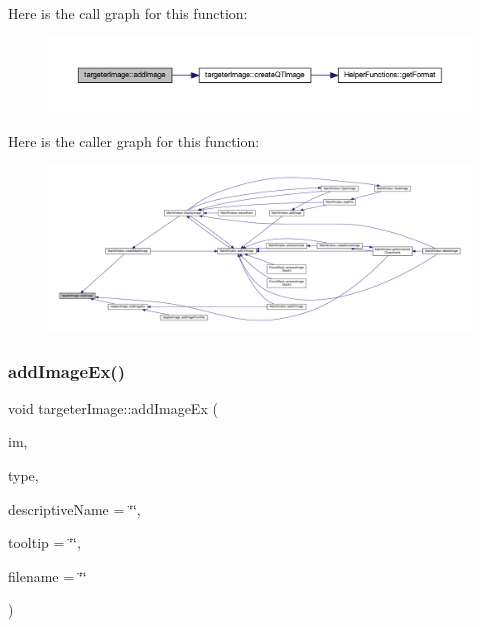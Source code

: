 Here is the call graph for this function\+:
\nopagebreak
\begin{figure}[H]
\begin{center}
\leavevmode
\includegraphics[width=350pt]{classtargeter_image_a20a228c177141e4f0ca2a7776c7f242d_cgraph}
\end{center}
\end{figure}
Here is the caller graph for this function\+:
\nopagebreak
\begin{figure}[H]
\begin{center}
\leavevmode
\includegraphics[width=350pt]{classtargeter_image_a20a228c177141e4f0ca2a7776c7f242d_icgraph}
\end{center}
\end{figure}
\mbox{\label{classtargeter_image_a71d81d6bc145df61da64989c14444d76}} 
\subsubsection{\texorpdfstring{add\+Image\+Ex()}{addImageEx()}}
{\footnotesize\ttfamily void targeter\+Image\+::add\+Image\+Ex (\begin{DoxyParamCaption}\item[{cv\+::\+Mat}]{im,  }\item[{image\+Type\+::image\+Type}]{type,  }\item[{std\+::string}]{descriptive\+Name = {\ttfamily \char`\"{}\char`\"{}},  }\item[{std\+::string}]{tooltip = {\ttfamily \char`\"{}\char`\"{}},  }\item[{std\+::string}]{filename = {\ttfamily \char`\"{}\char`\"{}} }\end{DoxyParamCaption})}

